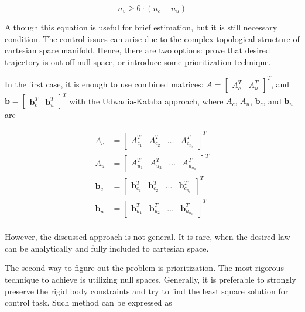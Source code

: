 \begin{equation}
    n_v \geq 6 \cdot (n_c + n_u)
\end{equation}

Although this equation is useful for brief estimation, but it is still necessary 
condition. The control issues can arise due to the complex topological structure 
of cartesian space manifold. Hence, there are two options: prove that desired 
trajectory is out off null space, or introduce some prioritization technique.

In the first case, it is enough to use combined matrices:
$A = \begin{bmatrix} A_c^T & A_u^T \end{bmatrix}^T$, and 
$\mathbf{b} = \begin{bmatrix} \mathbf{b}_c^T & \mathbf{b}_u^T \end{bmatrix}^T$ 
with the Udwadia-Kalaba approach, where $A_c$, $A_u$, $\mathbf{b}_c$, and 
$\mathbf{b}_u$ are 

\begin{equation}
    \begin{aligned}
        A_c & = \begin{bmatrix}
            A_{c_1}^T & A_{c_2}^T & \dots & A_{c_{n_c}}^T
        \end{bmatrix}^T \\
        A_u & = \begin{bmatrix}
            A_{u_1}^T & A_{u_2}^T & \dots & A_{u_{n_u}}^T
        \end{bmatrix}^T \\
        \mathbf{b}_c &= \begin{bmatrix}
            \mathbf{b}_{c_1}^T & \mathbf{b}_{c_2}^T & \dots & 
            \mathbf{b}_{c_{n_c}}^T
        \end{bmatrix}^T \\
        \mathbf{b}_u &= \begin{bmatrix}
            \mathbf{b}_{u_1}^T & \mathbf{b}_{u_2}^T & \dots & 
            \mathbf{b}_{u_{n_u}}^T
        \end{bmatrix}^T \\
    \end{aligned}
    \label{eqn:combined_a_and_b}
\end{equation}

However, the discussed approach is not general. It is rare, when the 
desired law can be analytically and fully included to cartesian space.

The second way to figure out the problem is prioritization. The most rigorous 
technique to achieve is utilizing null spaces. Generally, it is preferable to 
strongly preserve the rigid body constraints and try to find the least square 
solution for control task. Such method can be expressed as 

